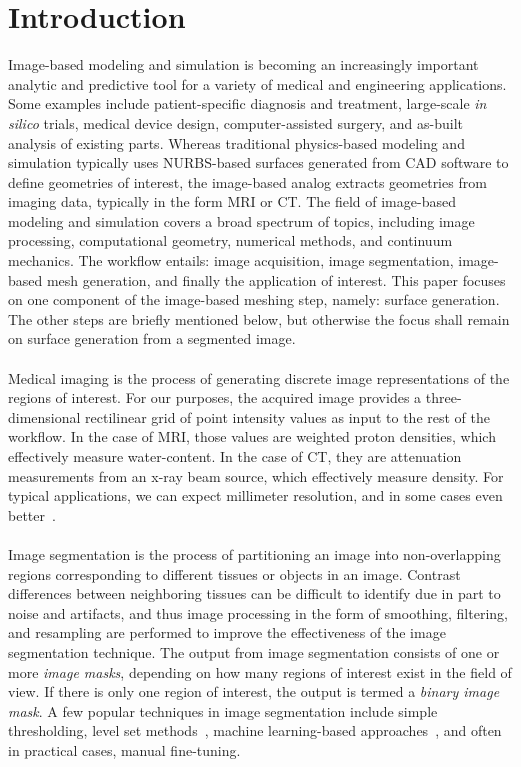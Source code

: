 \section{Introduction}

Image-based modeling and simulation is becoming an increasingly important analytic and predictive tool for a variety of medical and engineering applications. Some examples include patient-specific diagnosis and treatment, large-scale \textit{in silico} trials, medical device design, computer-assisted surgery, and as-built analysis of existing parts. Whereas traditional physics-based modeling and simulation typically uses NURBS-based surfaces generated from CAD software to define geometries of interest, the image-based analog extracts geometries from imaging data, typically in the form MRI or CT. The field of image-based modeling and simulation covers a broad spectrum of topics, including image processing, computational geometry, numerical methods, and continuum mechanics. The workflow entails: image acquisition, image segmentation, image-based mesh generation, and finally the application of interest. This paper focuses on one component of the image-based meshing step, namely: surface generation. The other steps are briefly mentioned below, but otherwise the focus shall remain on surface generation from a segmented image. \\ \\
%
Medical imaging is the process of generating discrete image representations of the regions of interest. For our purposes, the acquired image provides a three-dimensional rectilinear grid of point intensity values as input to the rest of the workflow. In the case of MRI, those values are weighted proton densities, which effectively measure water-content. In the case of CT, they are attenuation measurements from an x-ray beam source, which effectively measure density. For typical applications, we can expect millimeter resolution, and in some cases even better~\cite{van2012super}.\\ \\
%
Image segmentation is the process of partitioning an image into non-overlapping regions corresponding to different tissues or objects in an image. Contrast differences between neighboring tissues can be difficult to identify due in part to noise and artifacts, and thus image processing in the form of smoothing, filtering, and resampling are performed to improve the effectiveness of the image segmentation technique. The output from image segmentation consists of one or more \textit{image masks}, depending on how many regions of interest exist in the field of view. If there is only one region of interest, the output is termed a \textit{binary image mask}. A few popular techniques in image segmentation include simple thresholding, level set methods~\cite{malladi_1995, sethian_1996}, machine learning-based approaches~\cite{litjens_2017}, and often in practical cases, manual fine-tuning.\\ \\
